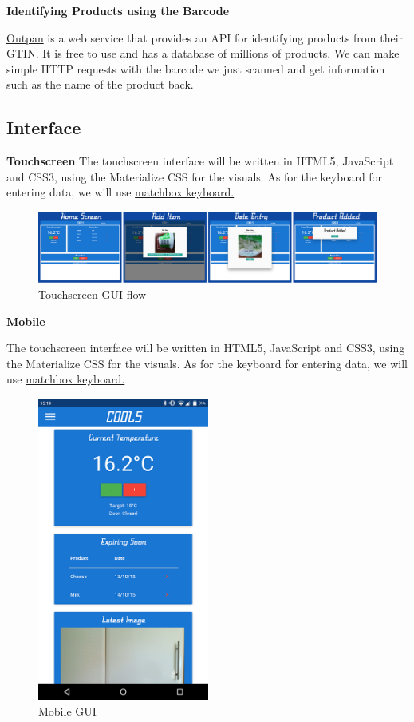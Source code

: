 \documentclass[10pt]{article}
\begin{document}
\textbf{Identifying Products using the Barcode}

\hyperref[https://www.outpan.com/]{Outpan} is a web service that provides an API for identifying products from their GTIN. It is free to use and has a database of millions of products. We can make simple HTTP requests with the barcode we just scanned and get information such as the name of the product back.

\subsection{Interface}

\textbf{Touchscreen}
The touchscreen interface will be written in HTML5, JavaScript and CSS3, using the Materialize CSS for the visuals. As for the keyboard for entering data, we will use \hyperref[https://github.com/xlab/matchbox-keyboard]{matchbox keyboard.}

\begin{figure}[h]
\centering
\caption{Touchscreen GUI flow}
\label{Touchscreen GUI flow}
\includegraphics[width=18cm]{images/GUI-flow.png}
\end{figure}


\textbf{Mobile}

The touchscreen interface will be written in HTML5, JavaScript and CSS3, using the Materialize CSS for the visuals. As for the keyboard for entering data, we will use \hyperref[https://github.com/xlab/matchbox-keyboard]{matchbox keyboard.}

\begin{figure}[h]
\centering
\caption{Mobile GUI}
\label{Mobile GUI}
\includegraphics[height=10cm]{images/Mobile-Screenshot.png}
\end{figure}
\end{document}
